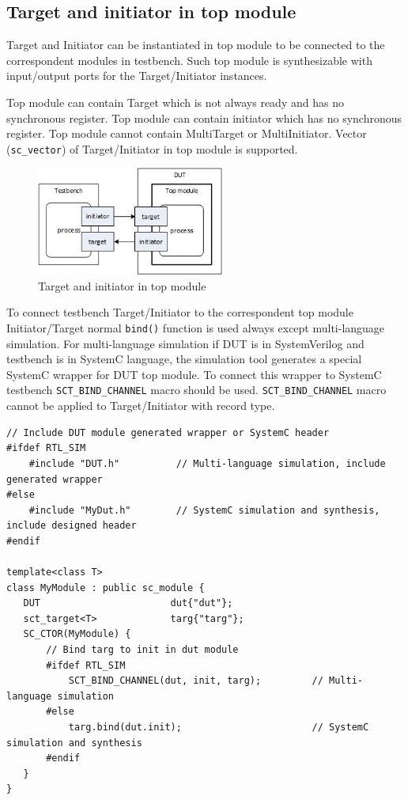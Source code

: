 \subsection{Target and initiator in top module}

Target and Initiator can be instantiated in top module to be connected to the correspondent modules in testbench. Such top module is synthesizable with input/output ports for the Target/Initiator instances.

Top module can contain Target which is not always ready and has no synchronous register. Top module can contain initiator which has no synchronous register. Top module cannot contain MultiTarget or MultiInitiator. Vector ({\tt sc\_vector}) of Target/Initiator in top module is supported.

\begin{figure}[!htb]
\centering
\includegraphics[width=0.55\textwidth]{pics/ss_top_mod.jpg}
\caption{Target and initiator in top module}
\label{fig:ss_top_mod}
\end{figure}

To connect testbench Target/Initiator to the correspondent top module Initiator/Target normal {\tt bind()} function is used always except multi-language simulation. For multi-language simulation if DUT is in SystemVerilog and testbench is in SystemC language, the simulation tool generates a special SystemC wrapper for DUT top module. To connect this wrapper to SystemC testbench {\tt SCT\_BIND\_CHANNEL} macro should be used. {\tt  SCT\_BIND\_CHANNEL} macro cannot be applied to Target/Initiator with record type.

\begin{lstlisting}[style=mycpp]
// Include DUT module generated wrapper or SystemC header 
#ifdef RTL_SIM
    #include "DUT.h"          // Multi-language simulation, include generated wrapper
#else 
    #include "MyDut.h"        // SystemC simulation and synthesis, include designed header
#endif

template<class T>
class MyModule : public sc_module {
   DUT                       dut{"dut"}; 
   sct_target<T>             targ{"targ"};
   SC_CTOR(MyModule) {
       // Bind targ to init in dut module 
       #ifdef RTL_SIM
           SCT_BIND_CHANNEL(dut, init, targ);         // Multi-language simulation
       #else 
           targ.bind(dut.init);                       // SystemC simulation and synthesis
       #endif
   }
}
\end{lstlisting}

